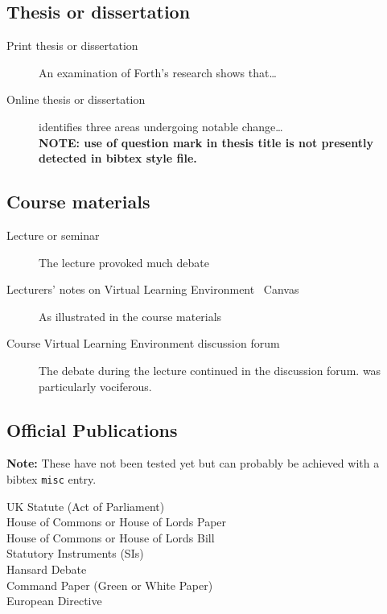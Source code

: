 \subsection{Thesis or dissertation}
\label{sec:thesis}
\begin{description}
\item[Print thesis or dissertation] An examination of Forth’s \citeyear{forth_morphological_1989}
research shows that…
\item[Online thesis or dissertation] \textcite{tatham_confidence_2010} identifies three areas
undergoing notable change…\\
\textbf{NOTE: use of question mark in thesis title is not presently detected in bibtex style file.}
\end{description}


\subsection{Course materials}
\label{sec:course}
\begin{description}
\item[Lecture or seminar] The lecture provoked much debate~\cite{johnson_peat_2012}
\item[Lecturers’ notes on Virtual Learning Environment \eg\ Canvas] As illustrated in the course materials~\cite{forth_analysis_2012}
\item[Course Virtual Learning Environment discussion forum] The debate during the lecture continued in the discussion forum. \textcite{hurst_are_2012} was
particularly vociferous.
\end{description}

\subsection{Official Publications}
\label{sec:officialPubs}
\textbf{Note:} These have not been tested yet but can probably be achieved with a bibtex \verb#misc# entry.
\begin{description}
\item[UK Statute (Act of Parliament)] 
\item[House of Commons or House of Lords Paper]
\item[House of Commons or House of Lords Bill]
\item[Statutory Instruments (SIs)]
\item[Hansard Debate]
\item[Command Paper (Green or White Paper)]
\item[European Directive]
\end{description}

